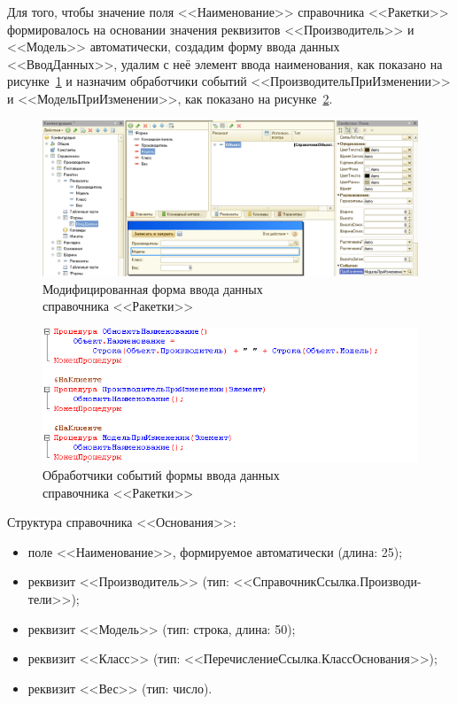 Для того, чтобы значение поля <<Наименование>> справочника <<Ракетки>>
формировалось на основании значения реквизитов <<Производитель>> и <<Модель>>
автоматически, создадим форму ввода данных <<ВводДанных>>,
удалим с неё элемент ввода наименования, как показано на
рисунке~\ref{fig:sprav_auto_name} и назначим обработчики событий
<<ПроизводительПриИзменении>> и <<МодельПриИзменении>>,
как показано на рисунке~\ref{fig:sprav_auto_name_module}.

\begin{figure}[h!]
  \centering
  \includegraphics[width=150mm]{pic/sprav_auto_name}
  \caption{Модифицированная форма ввода данных \\ справочника <<Ракетки>>}
  \label{fig:sprav_auto_name}
\end{figure}

\begin{figure}[h!]
  \centering
  \includegraphics[width=130mm]{pic/sprav_auto_name_module}
  \caption{Обработчики событий формы ввода данных \\ справочника <<Ракетки>>}
  \label{fig:sprav_auto_name_module}
\end{figure}

Структура справочника <<Основания>>:
\begin{itemize}
\item поле <<Наименование>>, формируемое автоматически (длина: 25);
\item реквизит <<Производитель>> (тип: <<СправочникСсылка.Производи-тели>>);
\item реквизит <<Модель>> (тип: строка, длина: 50);
\item реквизит <<Класс>> (тип: <<ПеречислениеСсылка.КлассОснования>>);
\item реквизит <<Вес>> (тип: число).
\end{itemize}

